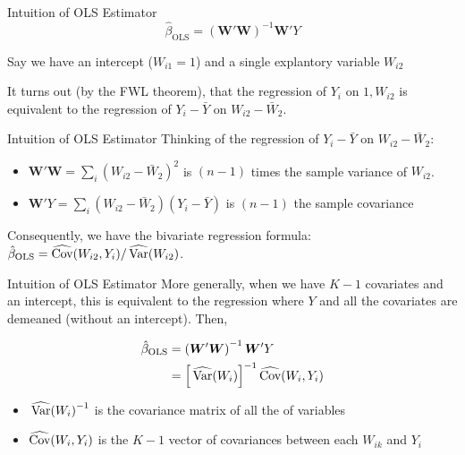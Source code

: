 \documentclass[aspectratio=169,t,11pt,table]{beamer}
\begin{document}
\begin{frame}{Intuition of OLS Estimator}
  \vspace*{-\bigskipamount}
  $$
    \hat{\beta}_{\text{OLS}} = \left(\bm{W}' \bm{W} \right)^{-1} \bm{W}' Y
  $$

  Say we have an intercept ($W_{i1} = 1$) and a single explantory variable $W_{i2}$

  \bigskip
  It turns out (by the FWL theorem), that the regression of $Y_i$ on $1, W_{i2}$ is equivalent to the regression of $Y_i - \bar{Y}$ on $W_{i2} - \bar{W}_2$.
\end{frame}

\begin{frame}{Intuition of OLS Estimator}
  Thinking of the regression of $Y_i - \bar{Y}$ on $W_{i2} - \bar{W}_2$:
  \begin{itemize}
    \item $\bm{W}' \bm{W} = \sum_i (W_{i2} - \bar{W}_2)^2$ is $(n-1)$ times the sample variance of $W_{i2}$.
    
    \item $\bm{W}' Y = \sum_i (W_{i2} - \bar{W}_2) (Y_{i} - \bar{Y})$ is $(n-1)$ the sample covariance
  \end{itemize}

  \bigskip
  Consequently, we have the bivariate regression formula: $\hat{\beta}_{\text{OLS}} = \covhat{W_{i2}, Y_i} / \varhat{W_{i2}}$.
\end{frame}

\begin{frame}{Intuition of OLS Estimator}
  More generally, when we have $K-1$ covariates and an intercept, this is equivalent to the regression where $Y$ and all the covariates are demeaned (without an intercept). Then, 

  \begin{align*}
    \hat{\beta}_{\text{OLS}} &= 
    \left(\bm{W}' \bm{W} \right)^{-1} \bm{W}' Y \\
    &= \left[ \varhat{W_i} \right]^{-1} \covhat{W_i, Y_i}
  \end{align*}
  
  \begin{itemize}
    \item $\varhat{W_i}^{-1}$ is the covariance matrix of all the of variables
    
    \item $\covhat{W_i, Y_i}$ is the $K-1$ vector of covariances between each $W_{ik}$ and $Y_i$
  \end{itemize}
\end{frame}
\end{document}
